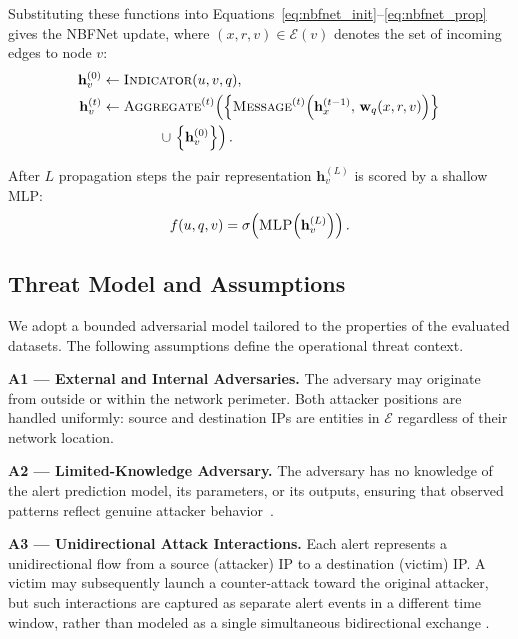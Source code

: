 \documentclass[10pt,journal,compsoc]{IEEEtran}
\begin{document}
\noindent
Substituting these functions into
Equations~\eqref{eq:nbfnet_init}--\eqref{eq:nbfnet_prop} gives the NBFNet update,
where $(x,r,v)\in\mathcal{E}(v)$ denotes the set of incoming
edges to node $v$:
\begin{align}
  \mathbf{h}_v^{(0)}
    &\leftarrow \textsc{Indicator}(u,v,q),
  \label{eq:nbfnet_ind} \\
  \mathbf{h}_v^{(t)}
    &\leftarrow \textsc{Aggregate}^{(t)}\!\left(
        \left\{
          \textsc{Message}^{(t)}\!\left(\mathbf{h}_x^{(t-1)},\,
          \mathbf{w}_q(x,r,v)\right)
        \right\} \right.\nonumber\\
    &\qquad\qquad \left. \cup\,
        \left\{\mathbf{h}_v^{(0)}\right\}
      \right). \nonumber
  \label{eq:nbfnet_update}
\end{align}

After $L$ propagation steps the pair representation $\mathbf{h}_v^{(L)}$ is
scored by a shallow MLP:
\begin{equation}
  f(u,q,v) = \sigma\!\left(\textsc{MLP}\!\left(\mathbf{h}_v^{(L)}\right)\right).
  \label{eq:nbfnet_score}
\end{equation}

\subsection{Threat Model and Assumptions}
\label{ssec:threat_model}
We adopt a bounded adversarial model tailored to the
properties of the evaluated datasets. The following
assumptions define the operational threat context.

\textbf{A1 --- External and Internal Adversaries.}
The adversary may originate from outside or within the
network perimeter. Both attacker positions are handled
uniformly: source and destination IPs are entities in
$\mathcal{E}$ regardless of their network location.

\textbf{A2 --- Limited-Knowledge Adversary.}
The adversary has no knowledge of the alert prediction
model, its parameters, or its outputs, ensuring that
observed patterns reflect genuine attacker behavior~\cite{9684707}.

\textbf{A3 --- Unidirectional Attack Interactions.}
Each alert represents a unidirectional flow from a source
(attacker) IP to a destination (victim) IP. A victim may
subsequently launch a counter-attack toward the original
attacker, but such interactions are captured as separate
alert events in a different time window, rather than
modeled as a single simultaneous bidirectional exchange \cite{xiong2023shrinking}.
\end{document}
